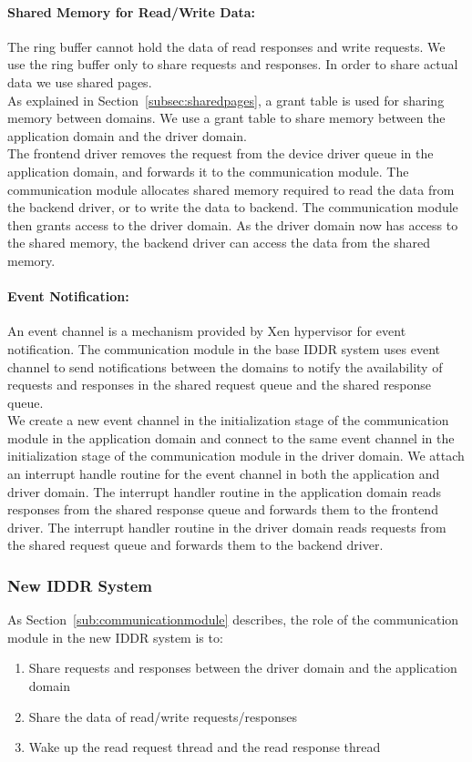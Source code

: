 \paragraph{Shared Memory for Read/Write Data:}
The ring buffer cannot hold the data of read responses and write requests. We use the ring buffer only to share requests and responses. In order to share actual data we use shared pages. 
\\[3mm]
As explained in Section~\ref{subsec:sharedpages}, a grant table is used for sharing memory between domains. We use a grant table to share memory between the application domain and the driver domain.
\\[3mm]
The frontend driver removes the request from the device driver queue in the application domain, and forwards it to the communication module. The communication module allocates shared memory required to read the data from the backend driver, or to write the data to backend. The communication module then grants access to the driver domain. As the driver domain now has access to the shared memory, the backend driver can access the data from the shared memory.

\paragraph{Event Notification:}
An event channel is a mechanism provided by Xen hypervisor for event notification. The communication module in the base IDDR system uses event channel to send notifications between the domains to notify the availability of requests and responses in the shared request queue and the shared response queue. 
\\[3mm]
We create a new event channel in the initialization stage of the communication module in the application domain and connect to the same event channel in the initialization stage of the communication module in the driver domain. We attach an interrupt handle routine for the event channel in both the application and driver domain. The interrupt handler routine in the application domain reads responses from the shared response queue and forwards them to the frontend driver. The interrupt handler routine in the driver domain reads requests from the shared request queue and forwards them to the backend driver.

\subsubsection*{New IDDR System}
As Section~\ref{sub:communicationmodule} describes, the role of the communication module in the new IDDR system is to:
\begin{enumerate} 
\item Share requests and responses between the driver domain and the application domain
\item Share the data of read/write requests/responses
\item Wake up the read request thread and the read response thread
\end{enumerate}
